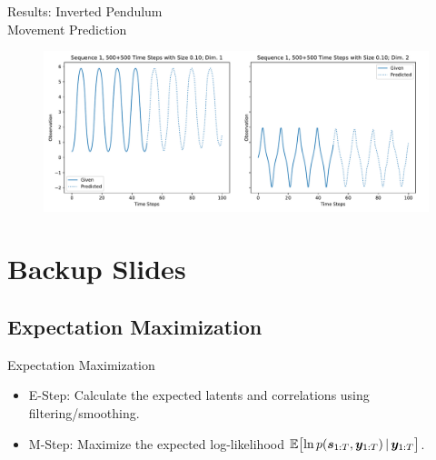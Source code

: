 \documentclass[
	aspectratio=43,
	color={accentcolor=1c},
	logo=false,
	colorframetitle=true,
]{tudabeamer}
\begin{document}
			\begin{frame}{Results: Inverted Pendulum \\ Movement Prediction}
				\vspace{-0.4cm}
				\begin{figure}
					\centering
					\includegraphics[width = \textwidth]{figures/results/pendulum/predicted-observations.pdf}
				\end{figure}
			\end{frame}





	\appendix

	\section{Backup Slides} \sectionslide
		\subsection{Expectation Maximization}
			\begin{frame}{Expectation Maximization}
				\begin{itemize}
					\item E-Step: Calculate the expected latents and correlations using filtering/smoothing.
					\item M-Step: Maximize the expected log-likelihood \( \mathbb{E}\big[\! \ln p(\bm{s}_{1:T}, \bm{y}_{1:T}) \,\vert\, \bm{y}_{1:T} \big] \).
				\end{itemize}
			\end{frame}
\end{document}
